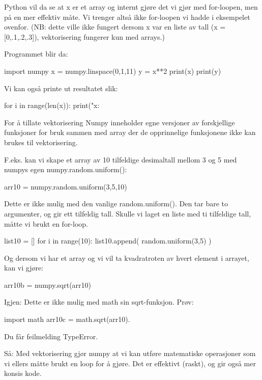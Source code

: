 Python vil da se at x er et array og internt gjøre det vi gjør med for-loopen, men på en mer effektiv måte. Vi trenger altså ikke for-loopen vi hadde i eksempelet ovenfor. (NB: dette ville ikke fungert dersom x var en liste av tall (x = [0,.1,.2,.3]), vektorisering fungerer kun med arrays.) 

Programmet blir da:
\begin{usncodebox}
import numpy
x = numpy.linspace(0,1,11)
y = x**2
print(x)
print(y)
\end{usncodebox}

Vi kan også printe ut resultatet slik:
\begin{usncodebox}
for i in range(len(x)):
    print("x:%
\end{usncodebox}

For å tillate vektorisering
Numpy inneholder egne versjoner av forskjellige funksjoner for bruk sammen med array 
der de opprinnelige funksjonene ikke kan brukes til vektorisering. 

F.eks. kan vi skape et array av 10 tilfeldige desimaltall mellom 3 og 5 med numpys 
egen numpy.random.uniform():
\begin{usncodebox} 
arr10 = numpy.random.uniform(3,5,10)
\end{usncodebox}

Dette er ikke mulig med den vanlige random.uniform(). Den tar bare to argumenter, og gir ett tilfeldig tall. Skulle vi laget en liste med ti tilfeldige tall, måtte vi brukt en for-loop.
\begin{usncodebox}
list10 = []
for i in range(10): 
    list10.append( random.uniform(3,5) ) 
\end{usncodebox}

Og dersom vi har et array og vi vil ta kvadratroten av hvert element i arrayet, kan vi gjøre:
\begin{usncodebox}
arr10b = numpy.sqrt(arr10)
\end{usncodebox}

Igjen: Dette er ikke mulig med math sin sqrt-funksjon. 
Prøv: 
\begin{usncodebox}
import math 
arr10c = math.sqrt(arr10).
\end{usncodebox}

Du får feilmelding TypeError. 

Så: Med vektorisering gjør numpy at vi kan utføre matematiske operasjoner som vi ellers måtte brukt en loop for å gjøre. Det er effektivt (raskt), og gir også mer konsis kode. 

